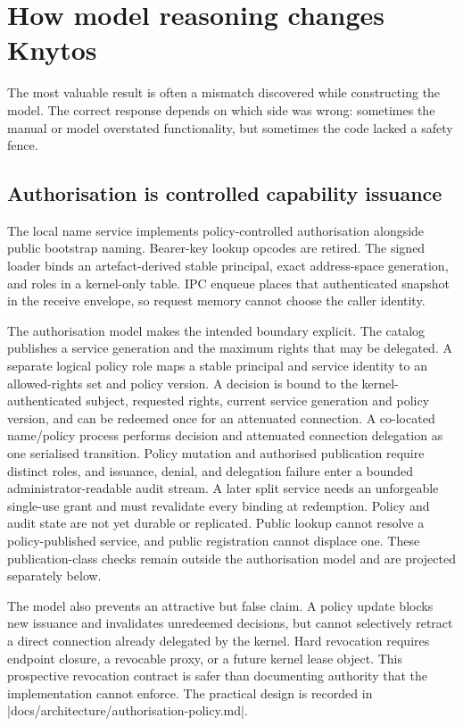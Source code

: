 \section[Model-driven findings]{How model reasoning changes Knytos}

The most valuable result is often a mismatch discovered while constructing the
model. The correct response depends on which side was wrong: sometimes the
manual or model overstated functionality, but sometimes the code lacked a safety
fence.

\subsection{Authorisation is controlled capability issuance}

The local name service implements policy-controlled authorisation alongside
public bootstrap naming. Bearer-key lookup opcodes are retired. The
signed loader binds an artefact-derived stable principal, exact address-space
generation, and roles in a kernel-only table. IPC enqueue places that
authenticated snapshot in the receive envelope, so request memory cannot choose
the caller identity.

The authorisation model makes the intended boundary explicit. The catalog
publishes a service generation and the maximum rights that may be delegated.
A separate logical policy role maps a stable principal and service identity to
an allowed-rights set and policy version. A decision is bound to the
kernel-authenticated subject, requested rights, current service generation and
policy version, and can be redeemed once for an attenuated connection. A
co-located name/policy process performs decision and attenuated connection
delegation as one serialised transition. Policy mutation and authorised
publication require distinct roles, and issuance, denial, and delegation
failure enter a bounded administrator-readable audit stream. A later split
service needs an unforgeable single-use grant and must revalidate every binding
at redemption. Policy and audit state are not yet durable or replicated.
Public lookup cannot resolve a policy-published service, and public
registration cannot displace one. These publication-class checks remain
outside the authorisation model and are projected separately below.

The model also prevents an attractive but false claim. A policy update blocks
new issuance and invalidates unredeemed decisions, but cannot selectively
retract a direct connection already delegated by the kernel. Hard revocation
requires endpoint closure, a revocable proxy, or a future kernel lease object.
This prospective revocation contract is safer than documenting authority that
the implementation cannot enforce. The practical design is recorded in
\repofile|docs/architecture/authorisation-policy.md|.

